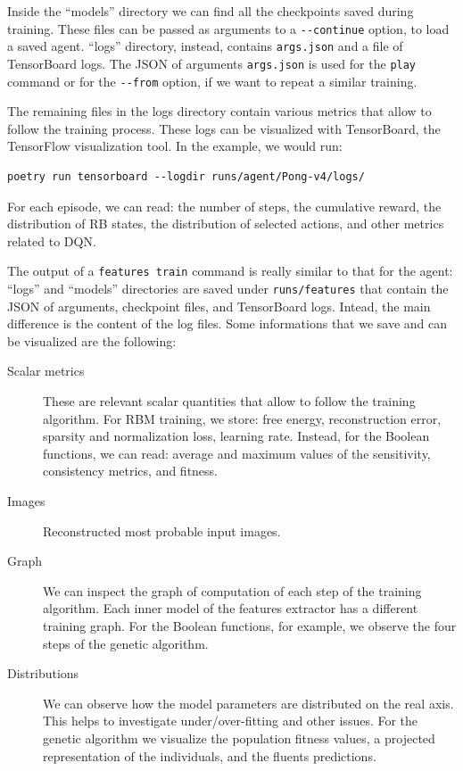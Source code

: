 Inside the ``models'' directory we can find all the checkpoints saved
during training. These files can be passed as arguments to a \verb|--continue|
option, to load a saved agent. ``logs'' directory, instead, contains
\verb|args.json| and a file of TensorBoard logs. The JSON of arguments
\verb|args.json| is used for the \texttt{play} command or for the
\verb|--from| option, if we want to repeat a similar training.

The remaining files in the logs directory contain various metrics that allow
to follow the training process. These logs can be visualized with TensorBoard,
the TensorFlow visualization tool. In the example, we would run:
\begin{lstlisting}[style=bash]
poetry run tensorboard --logdir runs/agent/Pong-v4/logs/
\end{lstlisting}
For each episode, we can read: the number of steps, the cumulative reward, the
distribution of RB states, the distribution of selected actions, and other
metrics related to DQN.

The output of a \texttt{features train} command is really similar to that for
the agent: ``logs'' and ``models'' directories are saved under
\verb|runs/features| that contain the JSON of arguments, checkpoint files, and
TensorBoard logs. Intead, the main difference is the content of the log files.
Some informations that we save and can be visualized are the following:
\begin{description}
	\item [Scalar metrics] These are relevant scalar quantities that allow to
		follow the training algorithm. For RBM training, we store: free energy,
		reconstruction error, sparsity and normalization loss, learning rate.
		Instead, for the Boolean functions, we can read: average and maximum
		values of the sensitivity, consistency metrics, and fitness.
	\item [Images] Reconstructed most probable input images.
	\item [Graph] We can inspect the graph of computation of each step of the
		training algorithm. Each inner model of the features extractor has a
		different training graph. For the Boolean functions, for example, we
		observe the four steps of the genetic algorithm.
	\item [Distributions] We can observe how the model parameters are
		distributed on the real axis. This helps to investigate under/over-fitting
		and other issues. For the genetic algorithm we visualize the population
		fitness values, a projected representation of the individuals, and the
		fluents predictions.
\end{description}


